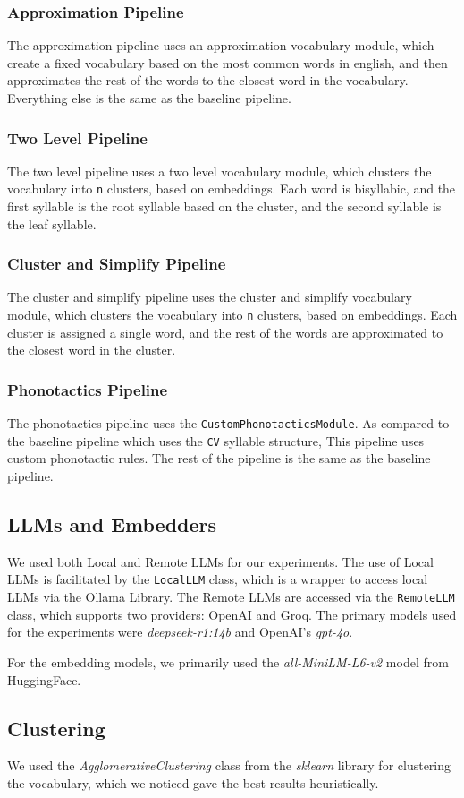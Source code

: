 \subsubsection{Approximation Pipeline}
The approximation pipeline uses an approximation vocabulary module, which create a fixed vocabulary based on the most common words in english, 
and then approximates the rest of the words to the closest word in the vocabulary. Everything else is the same as the baseline pipeline.
\subsubsection{Two Level Pipeline}
The two level pipeline uses a two level vocabulary module, which clusters the vocabulary into \texttt{n} clusters, based on embeddings. Each word is bisyllabic, 
and the first syllable is the root syllable based on the cluster, and the second syllable is the leaf syllable.
\subsubsection{Cluster and Simplify Pipeline}
The cluster and simplify pipeline uses the cluster and simplify vocabulary module, which clusters the vocabulary into \texttt{n} clusters, based on embeddings.
Each cluster is assigned a single word, and the rest of the words are approximated to the closest word in the cluster.
\subsubsection{Phonotactics Pipeline}
The phonotactics pipeline uses the \texttt{CustomPhonotacticsModule}. As compared to the baseline pipeline which uses the \texttt{CV} syllable structure,
This pipeline uses custom phonotactic rules. The rest of the pipeline is the same as the baseline pipeline.

\subsection{LLMs and Embedders}
We used both Local and Remote LLMs for our experiments. The use of Local LLMs is facilitated by the \texttt{LocalLLM} class, which is a wrapper 
to access local LLMs via the Ollama Library. The Remote LLMs are accessed via the \texttt{RemoteLLM} class, which supports two providers: OpenAI and Groq.
The primary models used for the experiments were \textit{deepseek-r1:14b} and OpenAI's \textit{gpt-4o}.  

For the embedding models, we primarily used the \textit{all-MiniLM-L6-v2} model from HuggingFace.

\subsection{Clustering}
We used the \textit{AgglomerativeClustering} class from the \textit{sklearn} library for clustering the vocabulary, which we noticed gave the best 
results heuristically.

